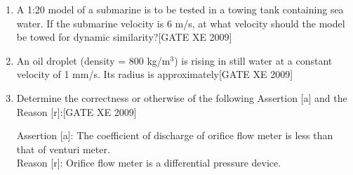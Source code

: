\documentclass[journal,12pt,onecolumn]{IEEEtran}
\theoremstyle{remark}
\begin{document}
\begin{enumerate}
\item A 1:20 model of a submarine is to be tested in a towing tank containing sea water. If the submarine velocity is 6 m/s, at what velocity should the model be towed for dynamic similarity?\hfill[GATE XE 2009]

\begin{enumerate}
\end{enumerate}



\item An oil droplet (density = 800 kg/m$^3$) is rising in still water at a constant velocity of 1 mm/s. Its radius is approximately\hfill[GATE XE 2009]

\begin{enumerate}
\end{enumerate}



\item Determine the correctness or otherwise of the following Assertion [a] and the Reason [r]:\hfill[GATE XE 2009]

Assertion [a]: The coefficient of discharge of orifice flow meter is less than that of venturi meter.\\
Reason [r]: Orifice flow meter is a differential pressure device.

\begin{enumerate}
\end{enumerate}





\end{enumerate}
\end{document}

